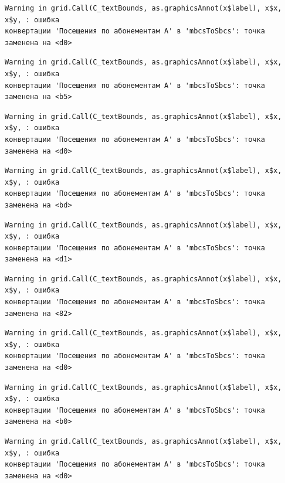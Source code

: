 \documentclass[
  letterpaper,
  DIV=11,
  numbers=noendperiod]{scrreprt}
\begin{document}
\begin{verbatim}
Warning in grid.Call(C_textBounds, as.graphicsAnnot(x$label), x$x, x$y, : ошибка
конвертации 'Посещения по абонементам А' в 'mbcsToSbcs': точка заменена на <d0>
\end{verbatim}

\begin{verbatim}
Warning in grid.Call(C_textBounds, as.graphicsAnnot(x$label), x$x, x$y, : ошибка
конвертации 'Посещения по абонементам А' в 'mbcsToSbcs': точка заменена на <b5>
\end{verbatim}

\begin{verbatim}
Warning in grid.Call(C_textBounds, as.graphicsAnnot(x$label), x$x, x$y, : ошибка
конвертации 'Посещения по абонементам А' в 'mbcsToSbcs': точка заменена на <d0>
\end{verbatim}

\begin{verbatim}
Warning in grid.Call(C_textBounds, as.graphicsAnnot(x$label), x$x, x$y, : ошибка
конвертации 'Посещения по абонементам А' в 'mbcsToSbcs': точка заменена на <bd>
\end{verbatim}

\begin{verbatim}
Warning in grid.Call(C_textBounds, as.graphicsAnnot(x$label), x$x, x$y, : ошибка
конвертации 'Посещения по абонементам А' в 'mbcsToSbcs': точка заменена на <d1>
\end{verbatim}

\begin{verbatim}
Warning in grid.Call(C_textBounds, as.graphicsAnnot(x$label), x$x, x$y, : ошибка
конвертации 'Посещения по абонементам А' в 'mbcsToSbcs': точка заменена на <82>
\end{verbatim}

\begin{verbatim}
Warning in grid.Call(C_textBounds, as.graphicsAnnot(x$label), x$x, x$y, : ошибка
конвертации 'Посещения по абонементам А' в 'mbcsToSbcs': точка заменена на <d0>
\end{verbatim}

\begin{verbatim}
Warning in grid.Call(C_textBounds, as.graphicsAnnot(x$label), x$x, x$y, : ошибка
конвертации 'Посещения по абонементам А' в 'mbcsToSbcs': точка заменена на <b0>
\end{verbatim}

\begin{verbatim}
Warning in grid.Call(C_textBounds, as.graphicsAnnot(x$label), x$x, x$y, : ошибка
конвертации 'Посещения по абонементам А' в 'mbcsToSbcs': точка заменена на <d0>
\end{verbatim}
\end{document}
